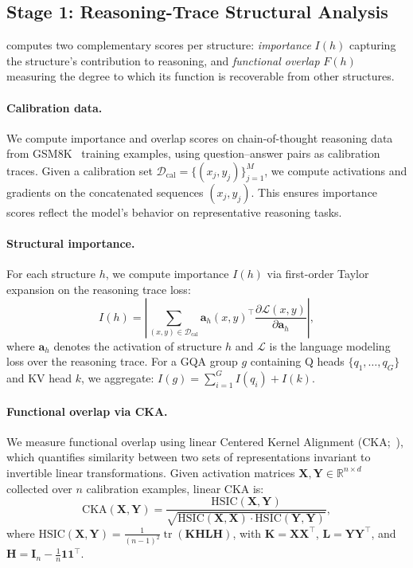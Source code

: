 \subsection{Stage 1: Reasoning-Trace Structural Analysis}
\label{sec:stage1}

\rasp{} computes two complementary scores per structure: \emph{importance} $I(h)$ capturing the structure's contribution to reasoning, and \emph{functional overlap} $F(h)$ measuring the degree to which its function is recoverable from other structures.

\paragraph{Calibration data.}
We compute importance and overlap scores on chain-of-thought reasoning data from GSM8K~\citep{cobbe2021gsm8k} training examples, using question--answer pairs as calibration traces.
Given a calibration set $\mathcal{D}_\text{cal} = \{(x_j, y_j)\}_{j=1}^{M}$, we compute activations and gradients on the concatenated sequences $(x_j, y_j)$.
This ensures importance scores reflect the model's behavior on representative reasoning tasks.

\paragraph{Structural importance.}
For each structure $h$, we compute importance $I(h)$ via first-order Taylor expansion on the reasoning trace loss:
\begin{equation}
    I(h) = \left| \sum_{(x,y) \in \mathcal{D}_\text{cal}} \mathbf{a}_h(x, y)^\top \frac{\partial \mathcal{L}(x, y)}{\partial \mathbf{a}_h} \right|,
    \label{eq:importance}
\end{equation}
where $\mathbf{a}_h$ denotes the activation of structure $h$ and $\mathcal{L}$ is the language modeling loss over the reasoning trace.
For a GQA group $g$ containing Q heads $\{q_1, \ldots, q_G\}$ and KV head $k$, we aggregate: $I(g) = \sum_{i=1}^{G} I(q_i) + I(k)$.

\paragraph{Functional overlap via CKA.}
We measure functional overlap using linear Centered Kernel Alignment (CKA;~\citealp{kornblith2019cka}), which quantifies similarity between two sets of representations invariant to invertible linear transformations.
Given activation matrices $\mathbf{X}, \mathbf{Y} \in \mathbb{R}^{n \times d}$ collected over $n$ calibration examples, linear CKA is:
\begin{equation}
    \text{CKA}(\mathbf{X}, \mathbf{Y}) = \frac{\text{HSIC}(\mathbf{X}, \mathbf{Y})}{\sqrt{\text{HSIC}(\mathbf{X}, \mathbf{X}) \cdot \text{HSIC}(\mathbf{Y}, \mathbf{Y})}},
    \label{eq:cka}
\end{equation}
where $\text{HSIC}(\mathbf{X}, \mathbf{Y}) = \frac{1}{(n-1)^2} \operatorname{tr}(\mathbf{K} \mathbf{H} \mathbf{L} \mathbf{H})$, with $\mathbf{K} = \mathbf{X}\mathbf{X}^\top$, $\mathbf{L} = \mathbf{Y}\mathbf{Y}^\top$, and $\mathbf{H} = \mathbf{I}_n - \frac{1}{n}\mathbf{1}\mathbf{1}^\top$.

